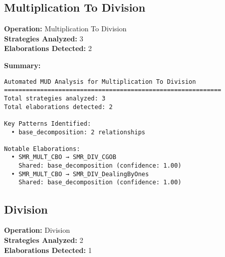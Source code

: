 \documentclass{article}
\begin{document}
\newpage
\subsection{Multiplication To Division}

\textbf{Operation:} Multiplication To Division\\
\textbf{Strategies Analyzed:} 3\\
\textbf{Elaborations Detected:} 2\\

\begin{center}
\end{center}

\textbf{Summary:}\\
\begin{verbatim}
Automated MUD Analysis for Multiplication To Division
============================================================
Total strategies analyzed: 3
Total elaborations detected: 2

Key Patterns Identified:
  • base_decomposition: 2 relationships

Notable Elaborations:
  • SMR_MULT_CBO → SMR_DIV_CGOB
    Shared: base_decomposition (confidence: 1.00)
  • SMR_MULT_CBO → SMR_DIV_DealingByOnes
    Shared: base_decomposition (confidence: 1.00)
\end{verbatim}

\newpage
\subsection{Division}

\textbf{Operation:} Division\\
\textbf{Strategies Analyzed:} 2\\
\textbf{Elaborations Detected:} 1\\
\end{document}
